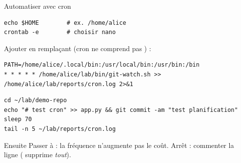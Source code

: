\documentclass[aspectratio=169,10pt,t]{beamer}
\begin{document}
\begin{frame}[fragile]{Automatiser avec cron}
\begin{lstlisting}[style=term]
echo $HOME        # ex. /home/alice
crontab -e        # choisir nano
\end{lstlisting}
Ajouter en rempla\c{c}ant  (cron ne comprend pas \code{\textasciitilde}) :
\begin{lstlisting}[style=term]
PATH=/home/alice/.local/bin:/usr/local/bin:/usr/bin:/bin
* * * * * /home/alice/lab/bin/git-watch.sh >> /home/alice/lab/reports/cron.log 2>&1
\end{lstlisting}
\begin{lstlisting}[style=term]
cd ~/lab/demo-repo
echo "# test cron" >> app.py && git commit -am "test planification"
sleep 70
tail -n 5 ~/lab/reports/cron.log
\end{lstlisting}
\begin{block}{Ensuite}
Passer \`a  : la fr\'equence n'augmente pas le co\^ut. Arr\^et : commenter la ligne ( supprime \emph{tout}).
\end{block}
\end{frame}

\end{document}

